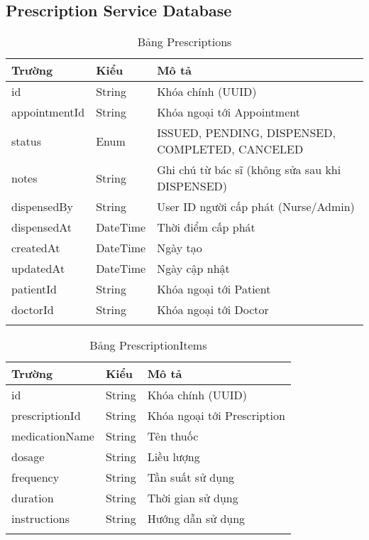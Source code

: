 \documentclass[12pt,a4paper]{report}
\begin{document}
    \subsection{Prescription Service Database}
    \begin{longtable}{|p{3cm}|p{2cm}|p{8cm}|}
    \hline
    \textbf{Trường} & \textbf{Kiểu} & \textbf{Mô tả} \\
    \hline
    id & String & Khóa chính (UUID) \\
    \hline
    appointmentId & String & Khóa ngoại tới Appointment \\
    \hline
    status & Enum & ISSUED, PENDING, DISPENSED, COMPLETED, CANCELED \\
    \hline
    notes & String & Ghi chú từ bác sĩ (không sửa sau khi DISPENSED) \\
    \hline
    dispensedBy & String & User ID người cấp phát (Nurse/Admin) \\
    \hline
    dispensedAt & DateTime & Thời điểm cấp phát \\
    \hline
    createdAt & DateTime & Ngày tạo \\
    \hline
    updatedAt & DateTime & Ngày cập nhật \\
    \hline
    patientId & String & Khóa ngoại tới Patient \\
    \hline
    doctorId & String & Khóa ngoại tới Doctor \\
    \hline
    \caption{Bảng Prescriptions}
    \end{longtable}

    \begin{longtable}{|p{3cm}|p{2cm}|p{8cm}|}
    \hline
    \textbf{Trường} & \textbf{Kiểu} & \textbf{Mô tả} \\
    \hline
    id & String & Khóa chính (UUID) \\
    \hline
    prescriptionId & String & Khóa ngoại tới Prescription \\
    \hline
    medicationName & String & Tên thuốc \\
    \hline
    dosage & String & Liều lượng \\
    \hline
    frequency & String & Tần suất sử dụng \\
    \hline
    duration & String & Thời gian sử dụng \\
    \hline
    instructions & String & Hướng dẫn sử dụng \\
    \hline
    \caption{Bảng PrescriptionItems}
    \end{longtable}
\end{document}
